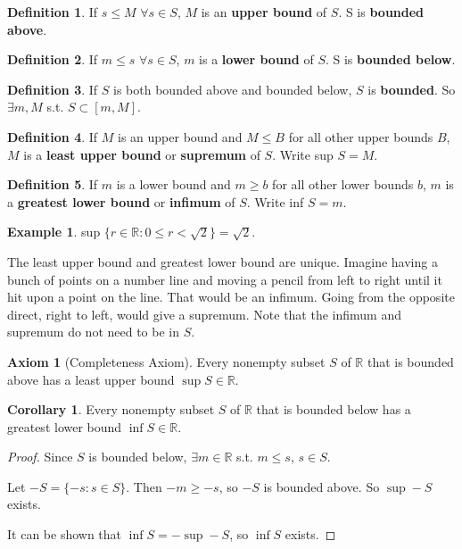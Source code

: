 \documentclass{article}
\theoremstyle{definition}
\newtheorem{definition}{Definition}
\newtheorem{example}{Example}
\newtheorem{axiom}{Axiom}
\newtheorem{corollary}{Corollary}
\begin{document}
\begin{definition}
If $s \leq M$ $\forall s \in S$, $M$ is an \textbf{upper bound} of $S$. S is \textbf{bounded above}.
\end{definition}

\begin{definition}
If $m \leq s$ $\forall s \in S$, $m$ is a \textbf{lower bound} of $S$. S is \textbf{bounded below}.
\end{definition}

\begin{definition}
If $S$ is both bounded above and bounded below, $S$ is \textbf{bounded}. So $\exists m, M$ s.t. $S \subset [m, M]$.
\end{definition}

\begin{definition}
If $M$ is an upper bound and $M \leq B$ for all other upper bounds $B$, $M$ is a \textbf{least upper bound} or \textbf{supremum} of $S$. Write sup $S = M$.
\end{definition}

\begin{definition}
If $m$ is a lower bound and $m \geq b$ for all other lower bounds $b$, $m$ is a \textbf{greatest lower bound} or \textbf{infimum} of $S$. Write inf $S = m$.
\end{definition}

\begin{example}
sup $\{r \in \mathbb{R} : 0 \leq r < \sqrt{2}\} = \sqrt{2}$.
\end{example}

The least upper bound and greatest lower bound are unique. Imagine having a bunch of points on a number line and moving a pencil from left to right until it hit upon a point on the line. That would be an infimum. Going from the opposite direct, right to left, would give a supremum. Note that the infimum and supremum do not need to be in $S$.

\begin{axiom}[Completeness Axiom]
Every nonempty subset $S$ of $\mathbb{R}$ that is bounded above has a least upper bound $\sup S \in\mathbb{R}$.
\end{axiom}

\begin{corollary}
Every nonempty subset $S$ of $\mathbb{R}$ that is bounded below has a greatest lower bound $\inf S \in\mathbb{R}$.
\end{corollary}

\begin{proof}
Since $S$ is bounded below, $\exists m \in \mathbb{R}$ s.t. $m \leq s$, $s \in S$.

Let $-S = \{ -s : s \in S \}$. Then $-m \ge -s$, so $-S$ is bounded above. So $\sup -S$ exists.

It can be shown that $\inf S = - \sup -S$, so $\inf S$ exists.

\end{proof}
\end{document}
